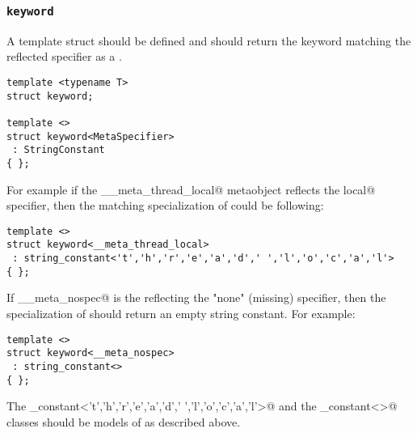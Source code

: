 \subsubsection{\texttt{keyword}}

A template struct \verb@keyword@ should be defined and should return
the keyword matching the reflected specifier as a
.

\begin{verbatim}
template <typename T>
struct keyword;

template <>
struct keyword<MetaSpecifier>
 : StringConstant
{ };
\end{verbatim}

For example if the \verb@__meta_thread_local@ metaobject reflects the \verb@thread local@
specifier, then the matching specialization of \verb@keyword@ could be following:

\begin{verbatim}
template <>
struct keyword<__meta_thread_local>
 : string_constant<'t','h','r','e','a','d',' ','l','o','c','a','l'>
{ };
\end{verbatim}

If \verb@__meta_nospec@ is the  reflecting the "none" (missing) specifier,
then the specialization of \verb@keyword@ should return an empty string constant.
For example:

\begin{verbatim}
template <>
struct keyword<__meta_nospec>
 : string_constant<>
{ };
\end{verbatim}

The \verb@string_constant<'t','h','r','e','a','d',' ','l','o','c','a','l'>@
and the \verb@string_constant<>@ classes should be models of 
as described above.

